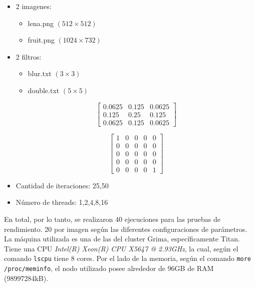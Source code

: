 \documentclass[letterpaper,10pt]{article}
\begin{document}
\begin{itemize}
\item 2 imagenes:
	\begin{itemize}
	\item lena.png $(512 \times 512)$
    \item fruit.png $(1024 \times 732)$
	\end{itemize}
\item 2 filtros:
	\begin{multicols}{2}
    	\begin{itemize}
        	\item blur.txt $(3 \times 3)$
        	\item double.txt $(5 \times 5)$
    	\end{itemize}
    \end{multicols}
    \begin{minipage}{0.5\linewidth}
      \[ \left[
      \begin{array}{ccc}
          0.0625 & 0.125 & 0.0625 \\
          0.125 & 0.25 & 0.125 \\
          0.0625 & 0.125 & 0.0625
      \end{array} \right]
      \]
    \end{minipage}
    \begin{minipage}{0.5\linewidth}
      \[ \left[
      \begin{array}{ccccc}
          1 & 0 & 0 & 0 & 0 \\ 
          0 & 0 & 0 & 0 & 0 \\
          0 & 0 & 0 & 0 & 0 \\
          0 & 0 & 0 & 0 & 0 \\
          0 & 0 & 0 & 0 & 1
      \end{array} \right]
      \]
    \end{minipage}
\item Cantidad de iteraciones:
  25,50
\item Número de threads:
  1,2,4,8,16
\end{itemize}

En total, por lo tanto, se realizaron 40 ejecuciones para las pruebas de rendimiento. 20 por imagen según las diferentes configuraciones de parámetros.\\

La máquina utilizada es una de las del cluster Grima, específicamente Titan. Tiene una CPU \textit{Intel(R) Xeon(R) CPU X5647 @ 2.93GHz}, la cual, según el comando \texttt{lscpu} tiene 8 cores. Por el lado de la memoria, según el comando \texttt{more /proc/meminfo}, el nodo utilizado posee alrededor de 96GB de RAM (98997284kB).
\end{document}
